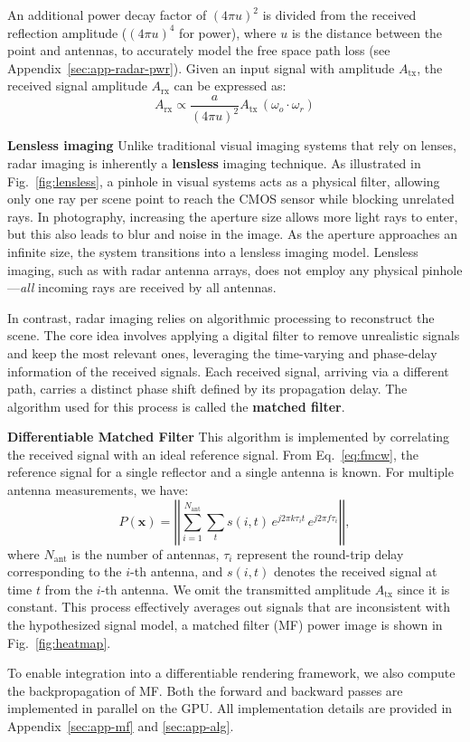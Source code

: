 An additional power decay factor of \({(4\pi u)^2}\) is divided from the received reflection amplitude (\({(4\pi u)^4}\) for power), where \(u\) is the distance between the point and antennas, to accurately model the free space path loss (see Appendix~\ref{sec:app-radar-pwr}). Given an input signal with amplitude $ A_{\text{tx}} $, the received signal amplitude $ A_{\text{rx}} $ can be expressed as:
\begin{equation}
\label{eq:reflection_angle}
A_{\text{rx}} \propto \frac{a}{(4\pi u)^2} A_{\text{tx}}\, (\omega_o \cdot \omega_r)
\end{equation}

\vspace{-0.1em}
\noindent \textbf{Lensless imaging}
Unlike traditional visual imaging systems that rely on lenses, radar imaging is inherently a \textbf{lensless} imaging technique.
As illustrated in Fig.~\ref{fig:lensless}, a pinhole in visual systems acts as a physical filter, allowing only one ray per scene point to reach the CMOS sensor while blocking unrelated rays.
In photography, increasing the aperture size allows more light rays to enter, but this also leads to blur and noise in the image.
As the aperture approaches an infinite size, the system transitions into a lensless imaging model.
Lensless imaging, such as with radar antenna arrays, does not employ any physical pinhole—\textit{all} incoming rays are received by all antennas.

In contrast, radar imaging relies on algorithmic processing to reconstruct the scene.
The core idea involves applying a digital filter to remove unrealistic signals and keep the most relevant ones, leveraging the time-varying and phase-delay information of the received signals.
Each received signal, arriving via a different path, carries a distinct phase shift defined by its propagation delay.
The algorithm used for this process is called the \textbf{matched filter}.

\vspace{-0.1em}
\noindent \textbf{Differentiable Matched Filter}
This algorithm is implemented by correlating the received signal with an ideal reference signal.
From Eq.~\ref{eq:fmcw}, the reference signal for a single reflector and a single antenna is known.
For multiple antenna measurements, we have:
\begin{equation}
\label{eq:mf-sm}
P(\mathbf{x}) = \left| \left| \sum_{i = 1}^{N_{\text{ant}}} \sum_{t} s(i, t) \, e^{j 2\pi k \tau_i t} \, e^{j 2\pi f \tau_i} \right| \right|,
\end{equation}
where \( N_{\text{ant}} \) is the number of antennas, \( \tau_i \) represent the round-trip delay corresponding to the \( i \)-th antenna, and \( s(i, t) \) denotes the received signal at time \( t \) from the \( i \)-th antenna. We omit the transmitted amplitude \( A_{\text{tx}} \) since it is constant.
This process effectively averages out signals that are inconsistent with the hypothesized signal model, a matched filter (MF) power image is shown in Fig.~\ref{fig:heatmap}.

To enable integration into a differentiable rendering framework, we also compute the backpropagation of MF.
Both the forward and backward passes are implemented in parallel on the GPU.
All implementation details are provided in Appendix~\ref{sec:app-mf} and \ref{sec:app-alg}.
